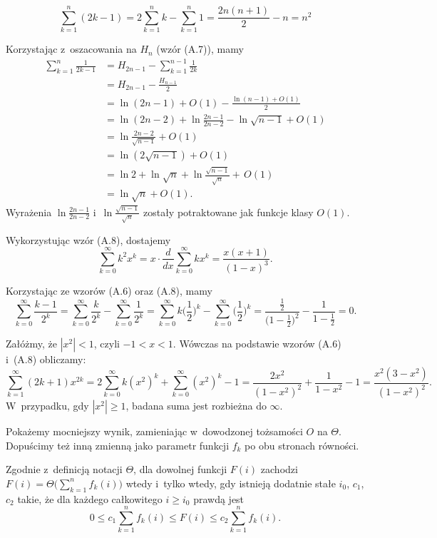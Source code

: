 
\exercise %
\[
	\sum_{k=1}^n(2k-1) = 2\sum_{k=1}^nk-\sum_{k=1}^n1 = \frac{2n(n+1)}{2}-n = n^2
\]

\exercise %
Korzystając z~oszacowania na $H_n$ (wzór (A.7)), mamy
\begin{align*}
	\sum_{k=1}^n\frac{1}{2k-1} &= H_{2n-1}-\sum_{k=1}^{n-1}\frac{1}{2k} \\
	&= H_{2n-1}-\frac{H_{n-1}}{2} \\
	&= \ln(2n-1)+O(1)-\frac{\ln(n-1)+O(1)}{2} \\
	&= \ln(2n-2)+\ln\frac{2n-1}{2n-2}-\ln\sqrt{n-1}+O(1) \\
	&= \ln\frac{2n-2}{\sqrt{n-1}}+O(1) \\[1mm]
	&= \ln(2\sqrt{n-1})+O(1) \\
	&= \ln2+\ln\sqrt{n}+\ln\frac{\sqrt{n-1}}{\sqrt{n}}+\,O(1) \\
	&= \ln\sqrt{n}+O(1).
\end{align*}
Wyrażenia $\ln\frac{2n-1}{2n-2}$ i~$\ln\frac{\sqrt{n-1}}{\sqrt{n}}$ zostały potraktowane jak funkcje klasy $O(1)$.

\exercise %
Wykorzystując wzór (A.8), dostajemy
\[
	\sum_{k=0}^\infty k^2x^k = x\cdot\frac{d}{dx}\sum_{k=0}^\infty kx^k = \frac{x(x+1)}{(1-x)^3}.
\]

\exercise %
Korzystając ze wzorów (A.6) oraz (A.8), mamy
\[
	\sum_{k=0}^\infty\frac{k-1}{2^k} = \sum_{k=0}^\infty\frac{k}{2^k}-\sum_{k=0}^\infty\frac{1}{2^k} = \sum_{k=0}^\infty k\biggl(\frac{1}{2}\biggr)^k-\sum_{k=0}^\infty\biggl(\frac{1}{2}\biggr)^k = \frac{\frac{1}{2}}{\bigl(1-\frac{1}{2}\bigr)^2}-\frac{1}{1-\frac{1}{2}} = 0.
\]

\exercise %
Załóżmy, że $|x^2|<1$, czyli $-1<x<1$.
Wówczas na podstawie wzorów (A.6) i~(A.8) obliczamy:
\[
	\sum_{k=1}^\infty(2k+1)x^{2k} = 2\sum_{k=0}^\infty k(x^2)^k+\sum_{k=0}^\infty(x^2)^k-1 = \frac{2x^2}{(1-x^2)^2}+\frac{1}{1-x^2}-1 = \frac{x^2(3-x^2)}{(1-x^2)^2}.
\]
W~przypadku, gdy $|x^2|\ge1$, badana suma jest rozbieżna do $\infty$.

\exercise %
Pokażemy mocniejszy wynik, zamieniając w~dowodzonej tożsamości $O$ na $\Theta$.
Dopuścimy też inną zmienną jako parametr funkcji $f_k$ po obu stronach równości.

Zgodnie z~definicją notacji $\Theta$, dla dowolnej funkcji $F(i)$ zachodzi $F(i)=\Theta\bigl(\sum_{k=1}^nf_k(i)\bigr)$ wtedy i~tylko wtedy, gdy istnieją dodatnie stałe $i_0$, $c_1$, $c_2$ takie, że dla każdego całkowitego $i\ge i_0$ prawdą jest
\[
	0 \le c_1\sum_{k=1}^nf_k(i) \le F(i) \le c_2\sum_{k=1}^nf_k(i).
\]


